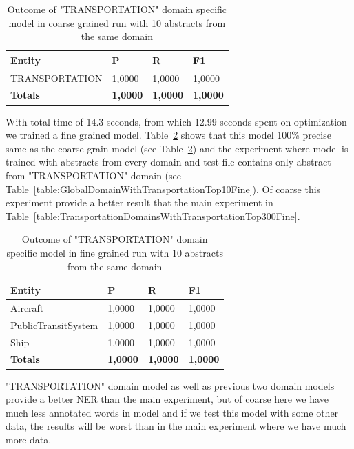 \documentclass[thesis=M,english]{FITthesis}[2018/05/30]
\begin{document}
	\begin{table}[H]\centering
		\begin{tabular}{|l|l|l|l|}
			\hline {\textbf{Entity}} & {\textbf{P}} & {\textbf{R}} & {\textbf{F1}}\\\hline
				TRANSPORTATION & 1,0000 & 1,0000 & 1,0000\\\hline
				\textbf{Totals} & \textbf{1,0000} & \textbf{1,0000} & \textbf{1,0000}\\\hline
		\end{tabular}
		\caption{Outcome of "TRANSPORTATION" domain specific model in coarse grained run with 10 abstracts from the same domain \label{table:TransportationDomainWithTransportationTop10Coarse}}
	\end{table}

	With total time of 14.3 seconds, from which 12.99 seconds spent on optimization we trained a fine grained model. Table~\ref{table:TransportationDomainWithTransportationTop10Fine} shows that this model 100\% precise same as the coarse grain model (see Table~\ref{table:TransportationDomainWithTransportationTop10Fine}) and the experiment where model is trained with abstracts from every domain and test file contains only abstract from "TRANSPORTATION" domain (see Table~\ref{table:GlobalDomainWithTransportationTop10Fine}). Of coarse this experiment provide a better result that the main experiment in Table~\ref{table:TransportationDomainsWithTransportationTop300Fine}.   
   
	\begin{table}[H]\centering
		\begin{tabular}{|l|l|l|l|}
			\hline {\textbf{Entity}} & {\textbf{P}} & {\textbf{R}} & {\textbf{F1}}\\\hline
				Aircraft & 1,0000 & 1,0000 & 1,0000\\
				PublicTransitSystem & 1,0000 & 1,0000 & 1,0000\\
				Ship & 1,0000 & 1,0000 & 1,0000\\\hline
				\textbf{Totals} & \textbf{1,0000} & \textbf{1,0000} & \textbf{1,0000}\\\hline
		\end{tabular}
		\caption{Outcome of "TRANSPORTATION" domain specific model in fine grained run with 10 abstracts from the same domain \label{table:TransportationDomainWithTransportationTop10Fine}}
	\end{table}

	"TRANSPORTATION" domain model as well as previous two domain models provide a better NER than the main experiment, but of coarse here we have much less annotated words in model and if we test this model with some other data, the results will be worst than in the main experiment where we have much more data.
	
\end{document}
